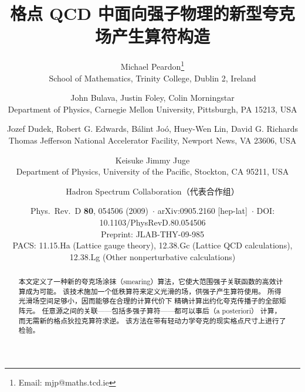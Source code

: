 \documentclass[11pt]{ctexart}
\title{\bfseries 格点 QCD 中面向强子物理的新型夸克场产生算符构造}
\author{Michael Peardon\thanks{Email: mjp@maths.tcd.ie}\\
  \normalsize School of Mathematics, Trinity College, Dublin 2, Ireland
  \and John Bulava, Justin Foley, Colin Morningstar\\
  \normalsize Department of Physics, Carnegie Mellon University,
  Pittsburgh, PA 15213, USA
  \and Jozef Dudek, Robert G. Edwards, B\'alint Jo\'o, Huey-Wen Lin,
  David G. Richards\\
  \normalsize Thomas Jefferson National Accelerator Facility, Newport News,
  VA 23606, USA
  \and Keisuke Jimmy Juge\\
  \normalsize Department of Physics, University of the Pacific,
  Stockton, CA 95211, USA
  \and \large Hadron Spectrum Collaboration（代表合作组）}
\date{%
  {\small Phys.\ Rev.\ D \textbf{80}, 054506 (2009)~$\cdot$
  arXiv:0905.2160 [hep-lat]~$\cdot$
  DOI: 10.1103/PhysRevD.80.054506}\\[2mm]
  {\small Preprint: JLAB-THY-09-985}\\[2mm]
  {\small PACS: 11.15.Ha (Lattice gauge theory),
  12.38.Gc (Lattice QCD calculations),
  12.38.Lg (Other nonperturbative calculations)}%
}
\begin{document}
\maketitle

\begin{abstract}
本文定义了一种新的夸克场涂抹（smearing）算法，它使大范围强子关联函数的高效计算成为可能。
该技术施加一个低秩算符来定义光滑的场，供强子产生算符使用。
所得光滑场空间足够小，因而能够在合理的计算代价下
精确计算出约化夸克传播子的全部矩阵元。
任意源之间的关联——包括多强子算符——都可以事后（a posteriori）
计算，而无需新的格点狄拉克算符求逆。
该方法在带有轻动力学夸克的现实格点尺寸上进行了检验。
\end{abstract}







\end{document}
